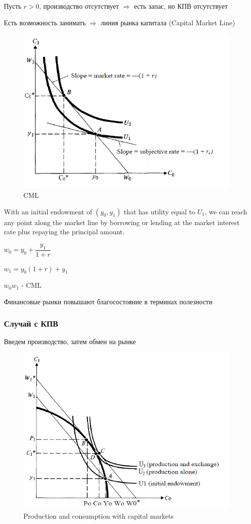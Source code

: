 \documentclass[a4paper,12pt]{article} %
\begin{document}
Пусть $ r > 0 $, производство отсутствует $ \Rightarrow $ есть запас, но КПВ отсутствует 

Есть возможность занимать  $ \Rightarrow  $ линия рынка капитала (Capital Market Line) 

\begin{figure}[h!]
	\centering
	\includegraphics[width=0.5\linewidth]{screenshot003}
	\caption{CML}
	\label{fig:screenshot003}
\end{figure}

With an initial endowment of $ (y_0, y_1) $ that has utility
equal to $ U_1 $, we can reach any point along the market line by borrowing or lending
at the market interest rate plus repaying the principal amount. 



$ w_0 = y_0 +  \dfrac{y_1}{1+r} $

$ w_1 = y_0(1+r) + y_1$

$ w_0w_1 $ - CML

Финансовые рынки повышают благосостояние в терминах полезности 

\subsubsection{Случай с КПВ}

Введем производство, затем обмен на рынке

\begin{figure}[h!]
	\centering
	\includegraphics[width=0.5\linewidth]{screenshot004}
	\caption{Production and consumption with capital markets}
	\label{fig:screenshot004}
\end{figure}
\end{document}
